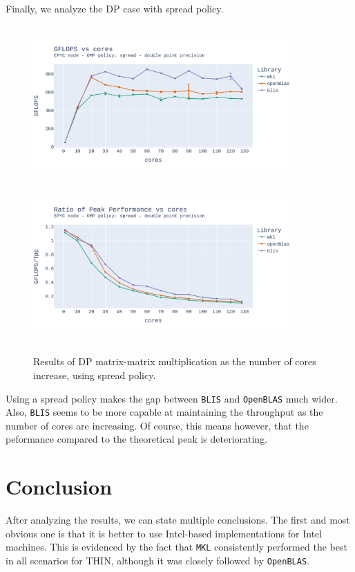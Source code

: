 \documentclass{report}
\begin{document}
Finally, we analyze the DP case with spread policy.

\begin{figure}[H]
\hspace*{-2.5cm}
\includegraphics[width=10cm, height=6cm]{./images/fixed_size_epyc_double_gflops_spread.pdf}
\includegraphics[width=10cm, height=6cm]{./images/fixed_size_epyc_double_gflops_spread_ratio.pdf}
\caption{\label{fig:fixed_size_epyc_double_spread} Results of DP matrix-matrix multiplication 
as the number of cores increase, using spread policy.}
\end{figure}

Using a spread policy makes the gap between \texttt{BLIS} and \texttt{OpenBLAS} much 
wider. Also, \texttt{BLIS} seems to be more capable at maintaining the throughput 
as the number of cores are increasing. Of course, this means however, that the 
peformance compared to the theoretical peak is deteriorating.

\section{Conclusion}

After analyzing the results, we can state multiple conclusions. The first and most 
obvious one is that it is better to use Intel-based implementations for Intel 
machines. This is evidenced by the fact that \texttt{MKL} consistently performed
the best in all scenarios for THIN, although it was closely followed by 
\texttt{OpenBLAS}. 
\end{document}
